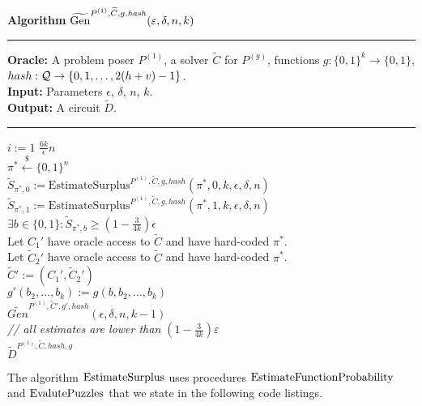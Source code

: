 \begin{codeblock}
  \textbf{Algorithm} $\widetilde{\operatorname{\text{Gen}}}^{P^{(1)}, \widetilde{C}, g, \mathit{hash}}(\varepsilon, \delta, n, k)$
  \medskip \hrule
  \textbf{Oracle:} A problem poser $P^{(1)}$, a solver $\widetilde{C}$ for $P^{(g)}$, functions $g: \{0,1\}^{k} \rightarrow \{0,1\}$, $hash:\mathcal{Q} \rightarrow \{0,1, \dots, 2(h + v) - 1\}$. \\
  \textbf{Input:}  Parameters $\epsilon$, $\delta$, $n$, $k$.\\
  \textbf{Output:} A circuit $\widetilde{D}$.
  \medskip\hrule
  \For $i:=1$ \To $\frac{6k}{\epsilon}n$ \Do \\
  \IndI $\pi^* \xleftarrow{\$} \{0,1\}^{n}$\\
  \IndI $\widetilde{S}_{\pi^*,0} := \text{EstimateSurplus}^{P^{(1)},  \widetilde{C}, g, hash}(\pi^*, 0, k, \epsilon, \delta,n)$\\
  \IndI $\widetilde{S}_{\pi^*,1} := \text{EstimateSurplus}^{P^{(1)},  \widetilde{C}, g, hash}(\pi^*, 1, k, \epsilon, \delta,n)$\\
  \IndI \If $ \exists b \in \{0,1\}: \widetilde{S}_{\pi^*,b} \geq (1 - \frac{3}{4k}) \epsilon$ \Then \\
  \IndII Let $C_1'$ have oracle access to $\widetilde{C}$ and have hard-coded $\pi^*$. \\
  \IndII Let $\widetilde{C}_2'$ have oracle access to $\widetilde{C}$ and have hard-coded $\pi^*$. \\
  \IndII $\widetilde{C}' := (C_1', \widetilde{C}_2')$ \\
  \IndII $g'(b_2, \dots, b_k) := g(b, b_2, \dots, b_k)$\\
  \IndII\Return $\widetilde{Gen}^{P^{(1)}, \widetilde{C}', g', hash}(\epsilon, \delta, n, k-1)$ \\
  \textit{// all estimates are lower than $(1-\frac{3}{4k})\varepsilon$}\\
  \Return $\widetilde{D}^{P^{(1)}, \widetilde{C}, hash, g}$
\end{codeblock}

The algorithm $\operatorname{\text{EstimateSurplus}}$ uses procedures $\operatorname{\text{EstimateFunctionProbability}}$ and $\operatorname{\text{EvalutePuzzles}}$
that we state in the following code listings.

